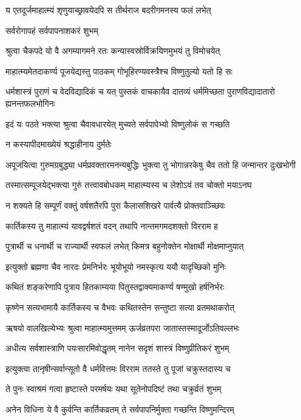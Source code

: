 \twolineshloka
{य एतदूर्जमाहात्म्यं शृणुयाच्छ्रावयेदपि}
{स तीर्थराज बदरीगमनस्य फलं लभेत्} %


\onelineshloka
{सर्वरोगापहं सर्वपापनाशकरं शुभम्} %

\twolineshloka
{श्रुत्वा चैकपदे यो वै अगम्यागमने रतः}
{कन्यास्वस्रोर्विक्रयिणमुभयं तु विमोचयेत्} %

\twolineshloka
{माहात्म्यमेतदाकर्ण्य पूजयेद्यस्तु पाठकम्}
{गोभूहिरण्यवस्त्रैश्च विष्णुतुल्यो यतो हि सः} %

\threelineshloka
{धर्मशास्त्रं पुराणं च वेदविद्यादिकं च यत्}
{पुस्तकं वाचकायैव दातव्यं धर्ममिच्छता}
{पुराणविद्यादातारो ह्यनन्तफलभोगिनः} %

\twolineshloka
{इदं यः पठते भक्त्या श्रुत्वा चैवावधारयेत्}
{मुच्यते सर्वपापेभ्यो विष्णुलोकं स गच्छति} %


\onelineshloka
{न कस्यापीदमाख्येयं श्रद्धाहीनाय दुर्मतेः} %

\fourlineindentedshloka
{अपूजयित्वा गुरुमग्रबुद्ध्या}
{धर्मप्रवक्तारमनन्यबुद्धिः}
{भुक्त्वा तु भोगान्नरकेषु चैव}
{ततो हि जन्मान्तर दुःखभोगी} %

\twolineshloka
{तस्मात्सम्पूजयेद्भक्त्या गुरुं तत्त्वावबोधकम्}
{माहात्म्यस्य च लेशोऽयं तव चोक्तो मयाऽनघ} %

\twolineshloka
{न शक्यते हि सम्पूर्णं वक्तुं वर्षशतैरपि}
{पुरा कैलासशिखरे पार्वत्यै प्रोक्तवाञ्च्छिवः} %

\twolineshloka
{कार्तिकस्य तु माहात्म्यं यावद्वर्षशतं वदन्}
{तथापि नान्तमगमदशक्तो विरराम ह} %

\twolineshloka
{पुत्रार्थी च धनार्थी च राज्यार्थी स्वफलं लभेत्}
{किमत्र बहुनोक्तेन मोक्षार्थी मोक्षमाप्नुयात्} %


\twolineshloka
{इत्युक्तो ब्रह्मणा चैव नारदः प्रेमनिर्भरः}
{भूयोभूयो नमस्कृत्य ययौ यादृच्छिको मुनिः} %

\twolineshloka
{कथितं शङ्करेणापि पुत्राय हितकाम्यया}
{पितुस्तद्वाक्यमाकर्ण्य षण्मुखो हर्षनिर्भरः} %

\twolineshloka
{कृष्णेन सत्यभामायै कार्तिकस्य च वैभवः}
{कथितस्तेन सन्तुष्टा सत्या व्रतमथाकरोत्} %

\twolineshloka
{ऋषयो वालखिल्येभ्यः श्रुत्वा माहात्म्यमुत्तमम्}
{ऊर्जव्रतपरा जातास्तस्मादूर्जोऽतिवल्लभः} %

\twolineshloka
{अधीत्य सर्वशास्त्राणि पयःसारमिवोद्धृतम्}
{नानेन सदृशं शास्त्रं विष्णुप्रीतिकरं शुभम्} %


\twolineshloka
{इत्युक्त्वा तानृषीन्सर्वान्सूतो वै धर्मवित्तमः}
{विरराम ततस्ते तु पूजां चक्रुस्तदास्य च} %

\twolineshloka
{ते पुनः स्वाश्रमं गत्वा हृष्टास्ते परमर्षयः}
{यथा सूतेनोपदिष्टं तथा चक्रुर्व्रतं शुभम्} %

\twolineshloka
{अनेन विधिना ये वै कुर्वन्ति कार्तिकव्रतम्}
{ते सर्वपापनिर्मुक्ता गच्छन्ति विष्णुमन्दिरम्} %



\endgroup
